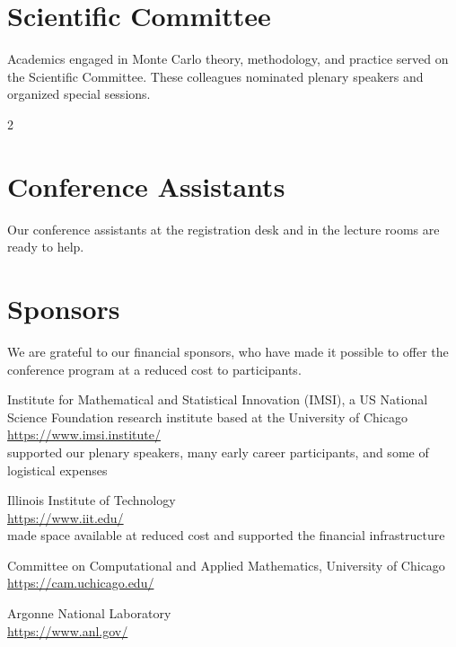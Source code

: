 \section{Scientific Committee} \label{sci_com}

Academics engaged in Monte Carlo theory, methodology, and practice served on the Scientific Committee.  These colleagues nominated plenary speakers and organized special sessions.


\setlength{\columnsep}{1cm}
\begin{multicols}{2}
\raggedright


\end{multicols}



\section{Conference Assistants} \label{assistants}
Our conference assistants at the registration desk and in the lecture rooms are ready to help.


\section{Sponsors}

We are grateful to our financial sponsors, who have made it possible to offer the conference program at a reduced cost to participants.

Institute for Mathematical and Statistical Innovation (IMSI), a US National Science Foundation research institute based at the University of Chicago\\
\url{https://www.imsi.institute/} \\
supported our plenary speakers, many early career participants, and some of logistical expenses

Illinois Institute of Technology\\
\url{https://www.iit.edu/} \\
made space available at reduced cost and supported the financial infrastructure

Committee on Computational and Applied Mathematics, University of Chicago\\
\url{https://cam.uchicago.edu/}

Argonne National Laboratory\\
\url{https://www.anl.gov/}

